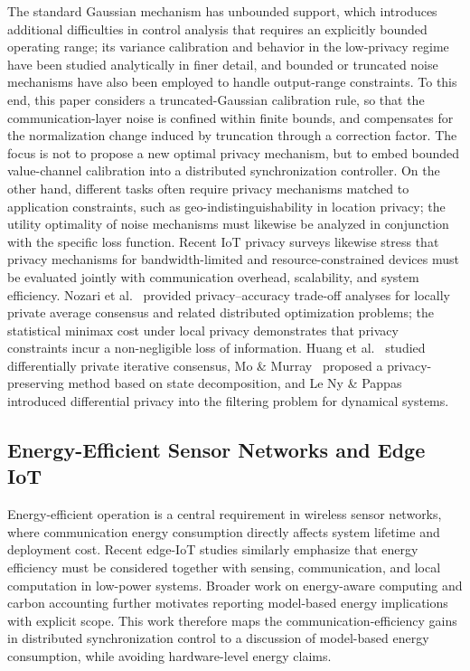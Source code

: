 \documentclass[10pt]{article}
\begin{document}
The standard Gaussian mechanism\cite{dwork2006,dwork2014} has unbounded support, which introduces additional difficulties in control analysis that requires an explicitly bounded operating range; its variance calibration and behavior in the low-privacy regime have been studied analytically in finer detail\cite{balle2018}, and bounded or truncated noise mechanisms have also been employed to handle output-range constraints\cite{chen2022bounded,fu2023truncated}. To this end, this paper considers a truncated-Gaussian calibration rule, so that the communication-layer noise is confined within finite bounds, and compensates for the normalization change induced by truncation through a correction factor. The focus is not to propose a new optimal privacy mechanism, but to embed bounded value-channel calibration into a distributed synchronization controller. On the other hand, different tasks often require privacy mechanisms matched to application constraints, such as geo-indistinguishability in location privacy\cite{andres2013}; the utility optimality of noise mechanisms must likewise be analyzed in conjunction with the specific loss function\cite{geng2016}. Recent IoT privacy surveys likewise stress that privacy mechanisms for bandwidth-limited and resource-constrained devices must be evaluated jointly with communication overhead, scalability, and system efficiency\cite{zaman2026iot_privacy}. Nozari et al.~\cite{nozari2017tac,nozari2017auto} provided privacy--accuracy trade-off analyses for locally private average consensus and related distributed optimization problems; the statistical minimax cost under local privacy demonstrates that privacy constraints incur a non-negligible loss of information\cite{duchi2013}. Huang et al.~\cite{huang2012} studied differentially private iterative consensus, Mo \& Murray~\cite{mo2017} proposed a privacy-preserving method based on state decomposition, and Le Ny \& Pappas~\cite{leny2014} introduced differential privacy into the filtering problem for dynamical systems.

\subsection{Energy-Efficient Sensor Networks and Edge IoT}

Energy-efficient operation is a central requirement in wireless sensor networks, where communication energy consumption directly affects system lifetime and deployment cost\cite{akyildiz2002}. Recent edge-IoT studies similarly emphasize that energy efficiency must be considered together with sensing, communication, and local computation in low-power systems\cite{katare2023approx_edge,mao2023green_edge,asiedu2024iot_energy}. Broader work on energy-aware computing and carbon accounting\cite{strubell2019,patterson2021} further motivates reporting model-based energy implications with explicit scope. This work therefore maps the communication-efficiency gains in distributed synchronization control to a discussion of model-based energy consumption, while avoiding hardware-level energy claims.
\end{document}
